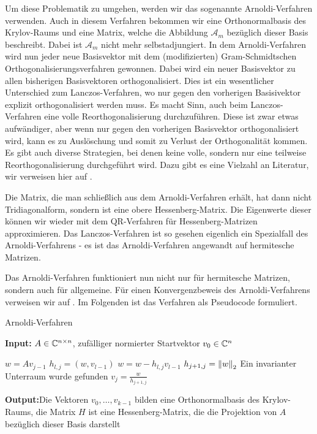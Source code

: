 \documentclass{article}
\theoremstyle{plain}
\begin{document}
Um diese Problematik zu umgehen, werden wir das sogenannte Arnoldi-Verfahren verwenden. Auch in diesem Verfahren bekommen wir eine Orthonormalbasis des Krylov-Raums und eine Matrix, welche die Abbildung $\mathcal{A}_m$ bezüglich dieser Basis beschreibt. Dabei ist $\mathcal{A}_m$ nicht mehr selbstadjungiert. In dem Arnoldi-Verfahren wird nun jeder neue Basisvektor mit dem (modifizierten) Gram-Schmidtschen Orthogonalisierungsverfahren gewonnen. Dabei wird ein neuer Basisvektor zu allen bisherigen Basisvektoren orthogonalisiert. Dies ist ein wesentlicher Unterschied zum Lanczos-Verfahren, wo nur gegen den vorherigen Basisivektor explizit orthogonalisiert werden muss.
Es macht Sinn, auch beim Lanczos-Verfahren eine volle Reorthogonalisierung durchzuführen. Diese ist zwar etwas aufwändiger, aber wenn nur gegen den vorherigen Basisvektor orthogonalisiert wird, kann es zu Auslöschung und somit zu Verlust der Orthogonalität kommen. Es gibt auch diverse Strategien, bei denen keine volle, sondern nur eine teilweise Reorthogonalisierung durchgeführt wird. Dazu gibt es eine Vielzahl an Literatur, wir verweisen hier auf \cite{reorthogonalization}.

Die Matrix, die man schließlich aus dem Arnoldi-Verfahren erhält, hat dann nicht Tridiagonalform, sondern ist eine obere Hessenberg-Matrix. Die Eigenwerte dieser können wir wieder mit dem QR-Verfahren für Hessenberg-Matrizen approximieren.
Das Lanczos-Verfahren ist so gesehen eigenlich ein Spezialfall des Arnoldi-Verfahrens - es ist das Arnoldi-Verfahren angewandt auf hermitesche Matrizen.

Das Arnoldi-Verfahren funktioniert nun nicht nur für hermitesche Matrizen, sondern auch für allgemeine. Für einen Konvergenzbeweis des Arnoldi-Verfahrens verweisen wir auf \cite{Saad_book}. Im Folgenden ist das Verfahren als Pseudocode formuliert.

\renewcommand{\algorithmicrequire}{\textbf{Input:}}
\renewcommand{\algorithmicensure}{\textbf{Output:}}

\begin{algorithm}[H]

	\caption{Arnoldi-Verfahren}
	\label{Arnoldi-Verfahren}
	\algorithmicrequire{ $A \in \C^{n\times n}$, zufälliger normierter Startvektor $v_0 \in \C^n$}
	\begin{algorithmic}[1]
			\State $w = A v_{j-1}$
				\State $h_{l,j} = (w, v_{l-1})$
				\State $w = w - h_{l,j}v_{l-1}$
			\EndFor
			\State $h_{j+1,j} = \norm[2]{w}$
			\State Ein invarianter Unterraum wurde gefunden
			\Else
				\State $v_j = \frac{w}{h_{j+1,j}}$
			\EndIf
		\EndFor
	\end{algorithmic}
	\algorithmicensure{Die Vektoren $v_0,\dots,v_{k-1}$ bilden eine Orthonormalbasis des Krylov-Raums, die Matrix $H$ ist eine Hessenberg-Matrix, die die Projektion von $A$ bezüglich dieser Basis darstellt}
\end{algorithm}
\end{document}
